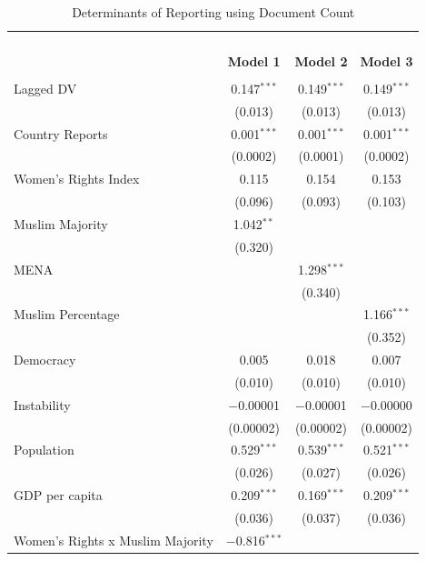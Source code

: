 \documentclass[11pt, oneside]{article}
\begin{document}
\begin{table}[!htbp] \centering 
  \caption{Determinants of Reporting using Document Count} 
  \label{table:negbin} 
\begin{tabular}{@{\extracolsep{5pt}}lccc} 
\\[-1.8ex]\hline \\[-1.8ex] 
\\[-1.8ex] & \multicolumn{3}{c}{\textbf{}} \\ 
\\[-1.8ex] & \textbf{Model 1} & \textbf{Model 2} & \textbf{Model 3}\\ 
\hline \\[-1.8ex] 
 Lagged DV & 0.147$^{***}$ & 0.149$^{***}$ & 0.149$^{***}$ \\ 
  & (0.013) & (0.013) & (0.013) \\ 
  Country Reports & 0.001$^{***}$ & 0.001$^{***}$ & 0.001$^{***}$ \\ 
  & (0.0002) & (0.0001) & (0.0002) \\ 
  Women's Rights Index & 0.115 & 0.154 & 0.153 \\ 
  & (0.096) & (0.093) & (0.103) \\ 
  Muslim Majority & 1.042$^{**}$ &  &  \\ 
  & (0.320) &  &  \\ 
  MENA &  & 1.298$^{***}$ &  \\ 
  &  & (0.340) &  \\ 
  Muslim Percentage &  &  & 1.166$^{***}$ \\ 
  &  &  & (0.352) \\ 
  Democracy & 0.005 & 0.018 & 0.007 \\ 
  & (0.010) & (0.010) & (0.010) \\ 
  Instability & $-$0.00001 & $-$0.00001 & $-$0.00000 \\ 
  & (0.00002) & (0.00002) & (0.00002) \\ 
  Population & 0.529$^{***}$ & 0.539$^{***}$ & 0.521$^{***}$ \\ 
  & (0.026) & (0.027) & (0.026) \\ 
  GDP per capita & 0.209$^{***}$ & 0.169$^{***}$ & 0.209$^{***}$ \\ 
  & (0.036) & (0.037) & (0.036) \\ 
  Women's Rights x Muslim Majority & $-$0.816$^{***}$ &  &  \\ 

\end{tabular}
\end{table}
\end{document}

